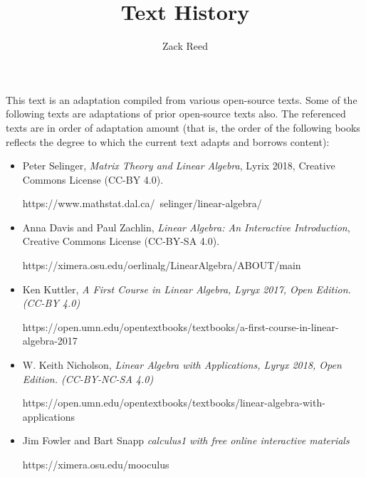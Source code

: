 \documentclass{ximera}
\author{Zack Reed}
\title{Text History}
\begin{document}
\begin{abstract}


\end{abstract}
\maketitle

This text is an adaptation compiled from various open-source texts. Some of the following texts are adaptations of prior open-source texts also. The referenced texts are in order of adaptation amount (that is, the order of the following books reflects the degree to which the current text adapts and borrows content):

\begin{itemize}

    \item Peter Selinger, {\it Matrix Theory and Linear Algebra}, Lyrix 2018, Creative Commons License (CC-BY 4.0).
    
    https://www.mathstat.dal.ca/~selinger/linear-algebra/
    
    \item Anna Davis and Paul Zachlin, {\it Linear Algebra: An Interactive Introduction}, Creative Commons License (CC-BY-SA 4.0).
    
    https://ximera.osu.edu/oerlinalg/LinearAlgebra/ABOUT/main

    \item Ken Kuttler, {\it A First Course in Linear Algebra, Lyryx 2017, Open Edition. (CC-BY 4.0)}
    
    https://open.umn.edu/opentextbooks/textbooks/a-first-course-in-linear-algebra-2017

    \item W. Keith Nicholson, {\it Linear Algebra with Applications, Lyryx 2018, Open Edition. (CC-BY-NC-SA 4.0)}
    
    https://open.umn.edu/opentextbooks/textbooks/linear-algebra-with-applications

    \item Jim Fowler and Bart Snapp {\it calculus1 with free online interactive materials}

    https://ximera.osu.edu/mooculus
    
\end{itemize}
\end{document}
